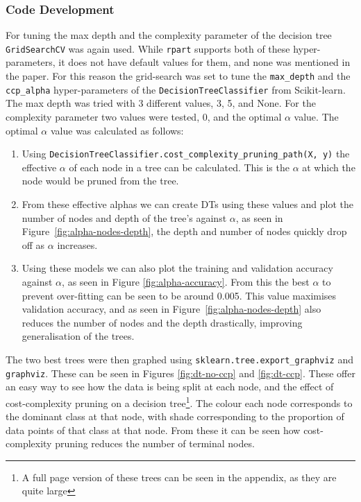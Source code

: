 \documentclass[12pt,a4paper,titlepage,twoside]{report}
\begin{document}
\subsubsection*{Code Development}
	For tuning the max depth and the complexity parameter of the decision tree \texttt{GridSearchCV} was again used. While \texttt{rpart} supports both of these hyper-parameters, it does not have default values for them, and none was mentioned in the paper. For this reason the grid-search was set to tune the \texttt{max_depth} and the \texttt{ccp_alpha} hyper-parameters of the \texttt{DecisionTreeClassifier} from Scikit-learn. The max depth was tried with 3 different values, 3, 5, and None. For the complexity parameter two values were tested, 0, and the optimal $\alpha$ value. The optimal $\alpha$ value was calculated as follows:
	
	\begin{enumerate}
	\item Using \texttt{DecisionTreeClassifier.cost_complexity_pruning_path(X, y)} the effective $\alpha$ of each node in a tree can be calculated. This is the $\alpha$ at which the node would be pruned from the tree. 
	\item From these effective alphas we can create DTs using these values and plot the number of nodes and depth of the tree's against $\alpha$, as seen in Figure~\ref{fig:alpha-nodes-depth}, the depth and number of nodes quickly drop off as $\alpha$ increases.
	\item Using these models we can also plot the training and validation accuracy against $\alpha$, as seen in Figure \ref{fig:alpha-accuracy}. From this the best $\alpha$ to prevent over-fitting can be seen to be around 0.005. This value maximises validation accuracy, and as seen in Figure~\ref{fig:alpha-nodes-depth} also reduces the number of nodes and the depth drastically, improving generalisation of the trees.
	\end{enumerate}
	
	The two best trees were then graphed using \texttt{sklearn.tree.export_graphviz} and \texttt{graphviz}. These can be seen in Figures \ref{fig:dt-no-ccp} and \ref{fig:dt-ccp}. These offer an easy way to see how the data is being split at each node, and the effect of cost-complexity pruning on a decision tree\footnote{A full page version of these trees can be seen in the appendix, as they are quite large}. The colour each node corresponds to the dominant class at that node, with shade corresponding to the proportion of data points of that class at that node. From these it can be seen how cost-complexity pruning reduces the number of terminal nodes.
	
\end{document}
